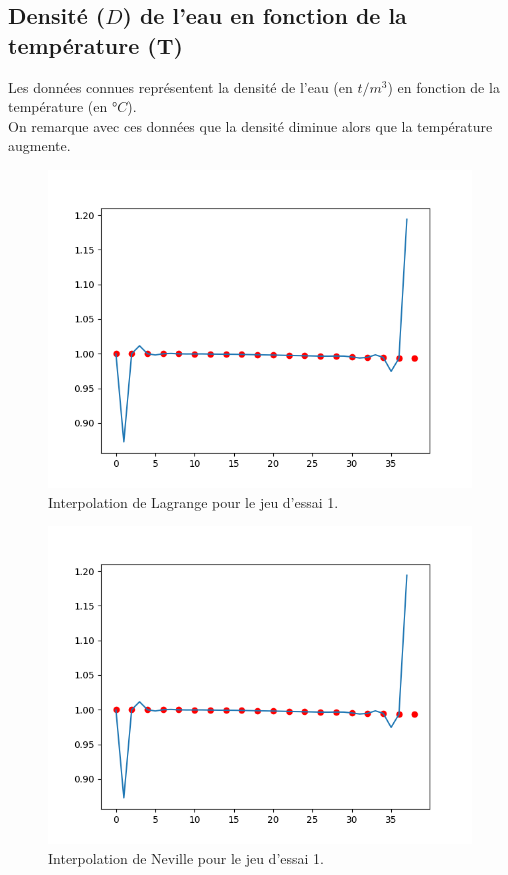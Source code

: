 \documentclass[12pt,french,titlepage]{article}
\begin{document}
	\subsection{Densité ($D$) de l'eau en fonction de la température (T)}
		Les données connues représentent la densité de l'eau (en $t/m^3$) en fonction de la température (en $°C$).\\
		On remarque avec ces données que la densité diminue alors que la température augmente.\\
		\begin{figure}[H]
		\includegraphics[width=\textwidth]{"11.png"}
		\caption{Interpolation de Lagrange pour le jeu d'essai 1.}
		\end{figure}
		
		\begin{figure}[H]
		\includegraphics[width=\textwidth]{"12.png"}
		\caption{Interpolation de Neville pour le jeu d'essai 1.}
		\end{figure}
	
\end{document}
